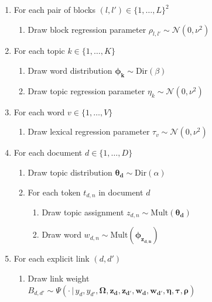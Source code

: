 \begin{small}
\begin{enumerate}[leftmargin=*,noitemsep]
\item For each pair of blocks $(l,l')\in \{1,\ldots,L\}^2$
    \begin{enumerate}
    \item Draw block regression parameter $\rho_{l,l'}\sim \mathcal{N}(0,\nu^2)$
    \end{enumerate}
\item For each topic $k\in \{1,\ldots,K\}$
    \begin{enumerate}
    \item Draw word distribution $\bm{\phi_k}\sim \mathrm{Dir}(\beta)$
    \item Draw topic regression parameter $\eta_k\sim \mathcal{N}(0,\nu^2)$
    \end{enumerate}
\item For each word $v\in \{1,\ldots,V\}$
    \begin{enumerate}
    \item Draw lexical regression parameter $\tau_v\sim \mathcal{N}(0,\nu^2)$
    \end{enumerate}
\item For each document $d\in \{1,\ldots,D\}$
    \begin{enumerate}
    \item Draw topic distribution $\bm{\theta_d}\sim \mathrm{Dir}(\alpha)$
    \item For each token $t_{d,n}$ in document $d$
        \begin{enumerate}
        \item Draw topic assignment $z_{d,n}\sim \mathrm{Mult}(\bm{\theta_d})$
        \item Draw word $w_{d,n}\sim \mathrm{Mult}(\bm{\phi_{z_{d,n}}})$
        \end{enumerate}
    \end{enumerate}
\item For each explicit link $(d,d')$
    \begin{enumerate}
    \item Draw link weight\\
    $B_{d,d'}\sim \Psi(\cdot\,|\,y_d, y_{d'}, \bm{\Omega}, \bm{z_d}, \bm{z_{d'}}, \bm{w_d}, \bm{w_{d'}}, \bm{\eta}, \bm{\tau}, \bm{\rho})$
    \end{enumerate}
\end{enumerate}
\end{small}

